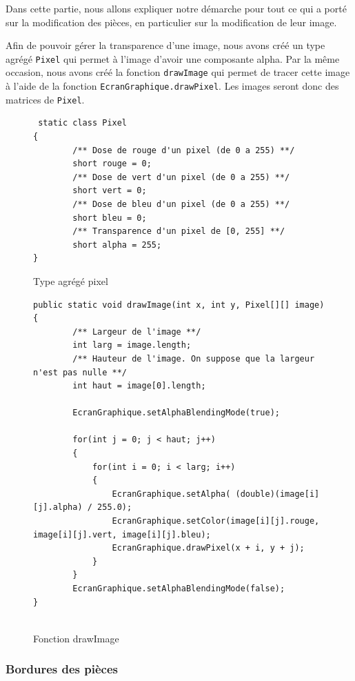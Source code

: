 \documentclass[]{article}
\newcommand{\variable}[1]{\noindent \texttt{#1}}
\begin{document}
Dans cette partie, nous allons expliquer notre démarche pour tout ce qui a porté sur la modification des pièces, en particulier sur la modification de leur image.

Afin de pouvoir gérer la transparence d'une image, nous avons créé un type agrégé \variable{Pixel} qui permet à l'image d'avoir une composante alpha. Par la même occasion, nous avons créé la fonction \variable{drawImage} qui permet de tracer cette image à l'aide de la fonction \variable{EcranGraphique.drawPixel}. Les images seront donc des matrices de \variable{Pixel}.

\begin{figure}[hpt]
	\center
	\caption{\label{Type agrégé pixel} Type agrégé pixel}
\begin{lstlisting}
 static class Pixel
{
        /** Dose de rouge d'un pixel (de 0 a 255) **/
        short rouge = 0;
        /** Dose de vert d'un pixel (de 0 a 255) **/
        short vert = 0;
        /** Dose de bleu d'un pixel (de 0 a 255) **/
        short bleu = 0;
        /** Transparence d'un pixel de [0, 255] **/
        short alpha = 255;
}

\end{lstlisting}
\end{figure}

\begin{figure}[hpt]
	\center
	\caption{\label{Fonction drawImage} Fonction drawImage}
\begin{lstlisting}
public static void drawImage(int x, int y, Pixel[][] image)
{
        /** Largeur de l'image **/
        int larg = image.length;
        /** Hauteur de l'image. On suppose que la largeur n'est pas nulle **/
        int haut = image[0].length;

        EcranGraphique.setAlphaBlendingMode(true);

        for(int j = 0; j < haut; j++)
        {
            for(int i = 0; i < larg; i++)
            {
                EcranGraphique.setAlpha( (double)(image[i][j].alpha) / 255.0);
                EcranGraphique.setColor(image[i][j].rouge, image[i][j].vert, image[i][j].bleu);
                EcranGraphique.drawPixel(x + i, y + j);
            }
        }
        EcranGraphique.setAlphaBlendingMode(false);
}


\end{lstlisting}
\end{figure}

\subsubsection{Bordures des pièces}
\end{document}
